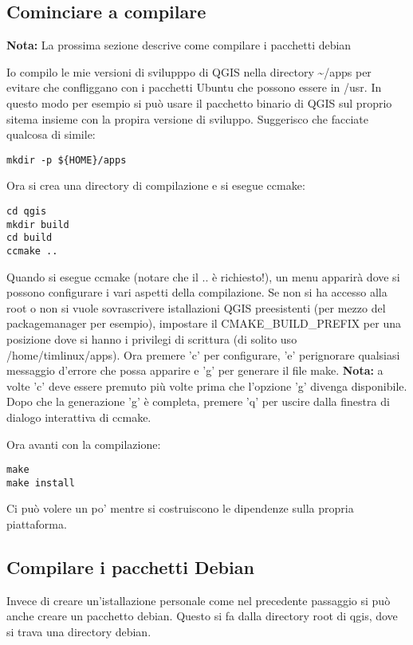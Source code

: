 \subsection{Cominciare a compilare}
\textbf{Nota:} La prossima sezione descrive come compilare i pacchetti debian

Io compilo le mie versioni di svilupppo di QGIS nella directory \~{}/apps per evitare che confliggano con i pacchetti Ubuntu che possono essere in /usr. In questo modo per esempio si può usare il pacchetto binario di QGIS sul proprio sitema insieme con la propira versione di sviluppo. Suggerisco che facciate qualcosa di simile:

\begin{verbatim}
mkdir -p ${HOME}/apps 
\end{verbatim}

Ora si crea una directory di compilazione e si esegue ccmake:

\begin{verbatim}
cd qgis
mkdir build
cd build
ccmake ..
\end{verbatim}

Quando si esegue ccmake (notare che il .. è richiesto!), un menu apparirà dove si possono configurare i vari aspetti della compilazione. Se non si ha accesso alla root o non si vuole sovrascrivere istallazioni QGIS preesistenti (per mezzo del packagemanager per esempio), impostare il CMAKE\_BUILD\_PREFIX per una posizione dove si hanno i privilegi di scrittura (di solito uso /home/timlinux/apps). Ora premere 'c' per configurare, 'e' perignorare qualsiasi messaggio d'errore che possa apparire e 'g' per generare il file make. \textbf{Nota:} a volte 'c' deve essere premuto più volte prima che l'opzione 'g' divenga disponibile. Dopo che la generazione 'g' è completa, premere 'q' per uscire dalla finestra di dialogo interattiva di ccmake.

Ora avanti con la compilazione:

\begin{verbatim}
make
make install
\end{verbatim}

Ci può volere un po' mentre si costruiscono le dipendenze sulla propria piattaforma.

\subsection{Compilare i pacchetti Debian}
Invece di creare un'istallazione personale come nel precedente passaggio si può anche creare un pacchetto debian. Questo si fa dalla directory root di qgis, dove si trava una directory debian.

